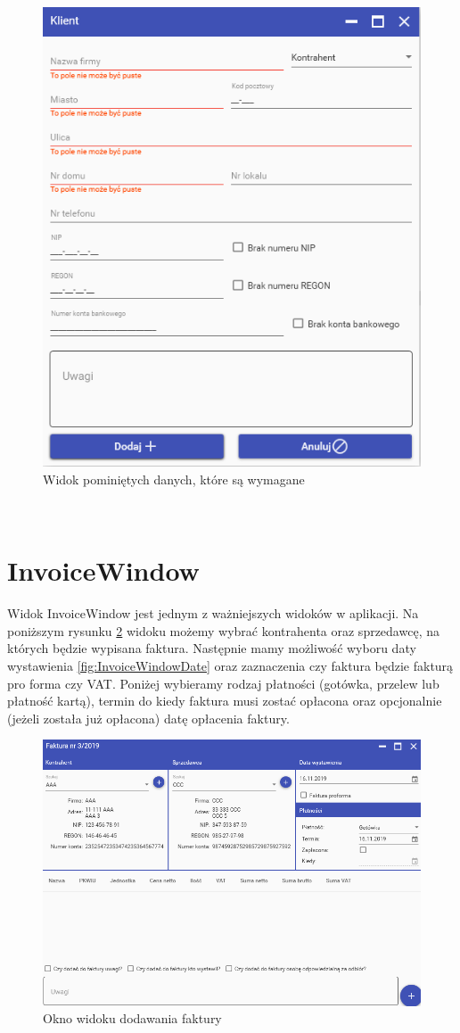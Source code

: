 \begin{figure}[ht!]
\centering
  \includegraphics[width=0.7\linewidth]{Rysunki/AddCustomer/AddCustomerError.png}
  \caption{Widok pominiętych danych, które są wymagane}
  \label{fig:AddCustomerWindowError}
\end{figure}

\newpage~\newpage~
\section{InvoiceWindow}
Widok InvoiceWindow jest jednym z ważniejszych widoków w aplikacji. Na poniższym rysunku \ref{fig:InvoiceWindow} widoku możemy wybrać kontrahenta oraz sprzedawcę, na których będzie wypisana faktura. Następnie mamy możliwość wyboru daty wystawienia \ref{fig:InvoiceWindowDate} oraz zaznaczenia czy faktura będzie fakturą pro forma czy VAT. Poniżej wybieramy rodzaj płatności (gotówka, przelew lub płatność kartą), termin do kiedy faktura musi zostać opłacona oraz opcjonalnie (jeżeli została już opłacona) datę opłacenia faktury.

\begin{figure}[ht!]
\centering
  \includegraphics[width=\linewidth]{Rysunki/Invoice/InvoiceWindow.png}
  \caption{Okno widoku dodawania faktury}
  \label{fig:InvoiceWindow}
\end{figure}


